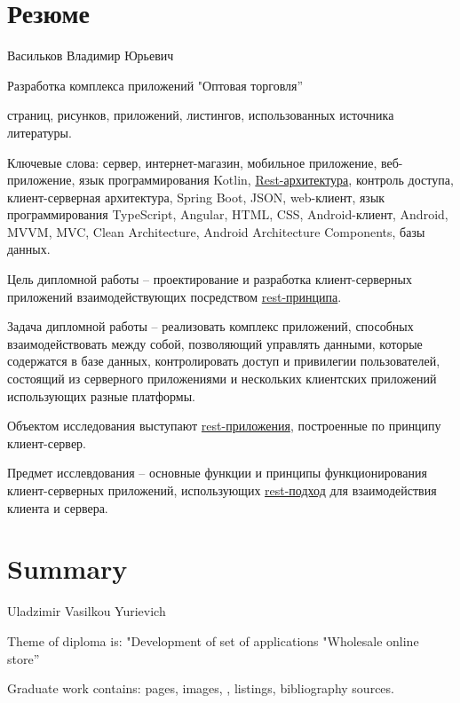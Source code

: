 \pagestyle{empty}
\section*{Резюме}\label{sec:cw-ru}\indent

Васильков Владимир Юрьевич

Разработка комплекса приложений "Оптовая торговля”

\pageref{LastPage} страниц,  рисунков,  приложений,  листингов,  использованных источника литературы.

Ключевые слова: сервер, интернет-магазин, мобильное приложение, веб-приложение, язык программирования Kotlin, \hyperlink{gloss:rest}{Rest-архитектура}, 
контроль доступа, клиент-серверная архитектура, Spring Boot, JSON, web-клиент, язык программирования TypeScript, Angular, HTML, CSS, Android-клиент, 
Android, MVVM, MVC, Clean Architecture, Android Architecture Components, базы данных.

Цель дипломной работы – проектирование и разработка клиент-серверных приложений взаимодействующих посредством \hyperlink{gloss:rest}{rest-принципа}.

Задача дипломной работы – реализовать комплекс приложений, способных взаимодействовать между собой, 
позволяющий управлять данными, которые содержатся в базе данных, контролировать доступ и привилегии пользователей, 
состоящий из серверного приложениями и нескольких клиентских приложений использующих разные платформы.

Объектом исследования выступают \hyperlink{gloss:rest}{rest-приложения}, построенные по принципу клиент-сервер.

Предмет исслевдования – основные функции и принципы функционирования клиент-серверных приложений, использующих \hyperlink{gloss:rest}{rest-подход} для взаимодействия клиента и сервера.

\section*{Summary}\label{sec:cw-eng}\indent
{}

Uladzimir Vasilkou Yurievich

Theme of diploma is: "Development of set of applications "Wholesale online store”

Graduate work contains: \pageref{LastPage} pages,  images, ,  listings,  bibliography sources.

